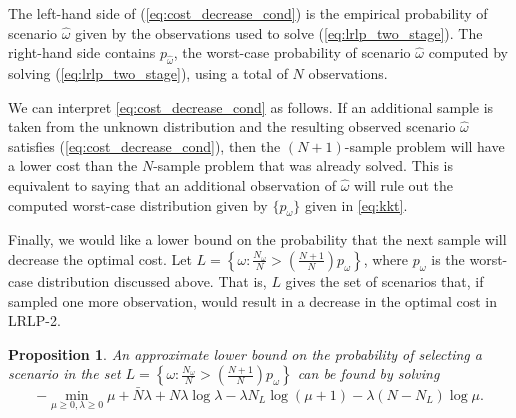 \documentclass[11pt]{article}
\newtheorem{proposition}[theorem]{Proposition}
\begin{document}
The left-hand side of (\ref{eq:cost_decrease_cond}) is the empirical probability of scenario $\hat{\omega}$ given by the observations used to solve (\ref{eq:lrlp_two_stage}).
The right-hand side contains $p_{\hat{\omega}}$, the worst-case probability of scenario $\hat{\omega}$ computed by solving (\ref{eq:lrlp_two_stage}), using a total of $N$ observations.

We can interpret \eqref{eq:cost_decrease_cond} as follows. If an additional sample is taken from the unknown distribution and the resulting observed scenario $\hat{\omega}$ satisfies (\ref{eq:cost_decrease_cond}), then the $(N+1)$-sample problem will have a lower cost than the $N$-sample problem that was already solved.
This is equivalent to saying that an additional observation of $\hat{\omega}$ will rule out the computed worst-case distribution given by $\{p_\omega\}$ given in \eqref{eq:kkt}.

Finally, we would like a lower bound on the probability that the next sample will decrease the optimal cost.
Let $L = \left\{ \omega : \frac{N_{\omega}}{N} > \left( \frac{N+1}{N} \right) p_\omega \right\}$, where $p_\omega$ is the worst-case distribution discussed above.
That is, $L$ gives the set of scenarios that, if sampled one more observation, would result in a decrease in the optimal cost in LRLP-2.

\begin{proposition}
	An approximate lower bound on the probability of selecting a scenario in the set $L= \left\{ \omega : \frac{N_{\omega}}{N} > \left( \frac{N+1}{N} \right) p_\omega \right\}$ can be found by solving 
	\begin{equation} \label{eq:prob_cost_decrease}
		-\min_{\mu \geq 0,\lambda \geq 0} \mu + \bar{N}\lambda + N\lambda\log\lambda - \lambda N_L \log(\mu + 1) - \lambda (N-N_L) \log\mu.
	\end{equation}
\end{proposition}
\end{document}
